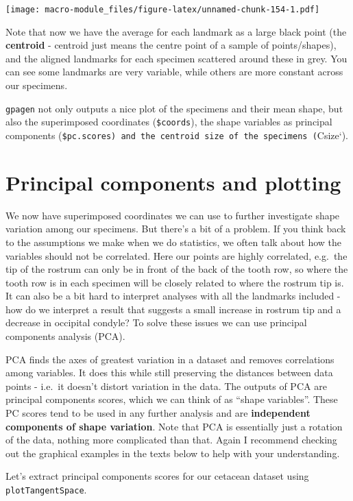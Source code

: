 \documentclass[]{book}
\begin{document}
\texttt{[image: macro-module\_files/figure-latex/unnamed-chunk-154-1.pdf]}

Note that now we have the average for each landmark as a large black
point (the \textbf{centroid} - centroid just means the centre point of a
sample of points/shapes), and the aligned landmarks for each specimen
scattered around these in grey. You can see some landmarks are very
variable, while others are more constant across our specimens.

\texttt{gpagen} not only outputs a nice plot of the specimens and their
mean shape, but also the superimposed coordinates (\texttt{\$coords}),
the shape variables as principal components
(\texttt{\$pc.scores)\ and\ the\ centroid\ size\ of\ the\ specimens\ (}Csize`).

\section{Principal components and
plotting}\label{principal-components-and-plotting}

We now have superimposed coordinates we can use to further investigate
shape variation among our specimens. But there's a bit of a problem. If
you think back to the assumptions we make when we do statistics, we
often talk about how the variables should not be correlated. Here our
points are highly correlated, e.g.~the tip of the rostrum can only be in
front of the back of the tooth row, so where the tooth row is in each
specimen will be closely related to where the rostrum tip is. It can
also be a bit hard to interpret analyses with all the landmarks included
- how do we interpret a result that suggests a small increase in rostrum
tip and a decrease in occipital condyle? To solve these issues we can
use principal components analysis (PCA).

PCA finds the axes of greatest variation in a dataset and removes
correlations among variables. It does this while still preserving the
distances between data points - i.e.~it doesn't distort variation in the
data. The outputs of PCA are principal components scores, which we can
think of as ``shape variables''. These PC scores tend to be used in any
further analysis and are \textbf{independent components of shape
variation}. Note that PCA is essentially just a rotation of the data,
nothing more complicated than that. Again I recommend checking out the
graphical examples in the texts below to help with your understanding.

Let's extract principal components scores for our cetacean dataset using
\texttt{plotTangentSpace}.
\end{document}
